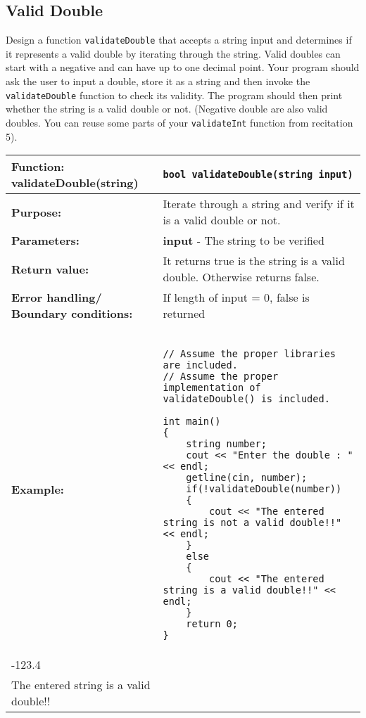 \subsection{Valid Double}
Design a function \texttt{validateDouble} that accepts a string input and determines if it represents a valid double by iterating through the string. Valid doubles can start with a negative and can have up to one decimal point. Your program should ask the user to input a double, store it as a string and then invoke the \texttt{validateDouble} function to check its validity. The program should then print whether the string is a valid double or not. (Negative double are also valid doubles. You can reuse some parts of your  \texttt{validateInt} function from recitation 5).
    \begin{longtable}{|p{1.7in}|p{4.3in}|} \hline
        \textbf{Function:} \newline 
        validateDouble(string) & \texttt{bool validateDouble(string input)}\\ \hline
        \textbf{Purpose:}  &Iterate through a string and verify if it is a valid double or not. \\ \hline
        \textbf{Parameters:} &  \hangindent=1cm \textbf{input} - The string to be verified \\ \hline
        \textbf{Return value:} &  It returns true is the string is a valid double. Otherwise returns false.  \\ \hline
        \textbf{Error handling/} \newline
        \textbf{Boundary conditions:} & If length of input = 0, false is returned  \\ \hline
        \textbf{Example:} & 
        \begin{example}
\begin{verbatim}

// Assume the proper libraries are included.
// Assume the proper implementation of validateDouble() is included.

int main()
{
    string number;
    cout << "Enter the double : " << endl;
    getline(cin, number);
    if(!validateDouble(number))
    {
        cout << "The entered string is not a valid double!!" << endl;
    }
    else
    {
        cout << "The entered string is a valid double!!" << endl;
    }
    return 0;
}
            \end{verbatim}
        \end{example}

        \begin{sample}
    Enter the double :\\
    -123.4\\
    The entered string is a valid double!!
        \end{sample}
             \\ \hline
    \end{longtable}

